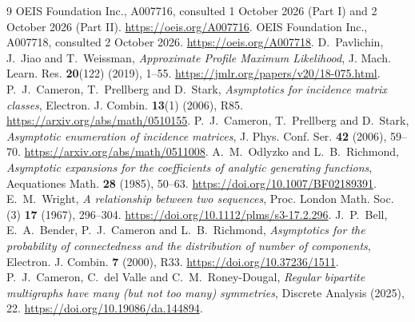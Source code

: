 \documentclass[11pt,a4paper]{article}
\theoremstyle{remark}\newtheorem{remark}[theorem]{Remark}%
\begin{document}
\begin{thebibliography}{9}\small
{} OEIS Foundation Inc., A007716, consulted 1 October 2026 (Part I) and 2 October 2026 (Part II). \url{https://oeis.org/A007716}.
 OEIS Foundation Inc., A007718, consulted 2 October 2026. \url{https://oeis.org/A007718}.
 D.~Pavlichin, J.~Jiao and T.~Weissman, \emph{Approximate Profile Maximum Likelihood}, J. Mach. Learn. Res. \textbf{20}(122) (2019), 1--55. \url{https://jmlr.org/papers/v20/18-075.html}.
 P.~J.~Cameron, T.~Prellberg and D.~Stark, \emph{Asymptotics for incidence matrix classes}, Electron. J. Combin. \textbf{13}(1) (2006), R85. \url{https://arxiv.org/abs/math/0510155}.
 P.~J.~Cameron, T.~Prellberg and D.~Stark, \emph{Asymptotic enumeration of incidence matrices}, J. Phys. Conf. Ser. \textbf{42} (2006), 59--70. \url{https://arxiv.org/abs/math/0511008}.
 A.~M.~Odlyzko and L.~B.~Richmond, \emph{Asymptotic expansions for the coefficients of analytic generating functions}, Aequationes Math. \textbf{28} (1985), 50--63. \url{https://doi.org/10.1007/BF02189391}.
 E.~M.~Wright, \emph{A relationship between two sequences}, Proc. London Math. Soc. (3) \textbf{17} (1967), 296--304. \url{https://doi.org/10.1112/plms/s3-17.2.296}.
 J.~P.~Bell, E.~A.~Bender, P.~J.~Cameron and L.~B.~Richmond, \emph{Asymptotics for the probability of connectedness and the distribution of number of components}, Electron. J. Combin. \textbf{7} (2000), R33. \url{https://doi.org/10.37236/1511}.
 P.~J.~Cameron, C.~del Valle and C.~M.~Roney-Dougal, \emph{Regular bipartite multigraphs have many (but not too many) symmetries}, Discrete Analysis (2025), 22. \url{https://doi.org/10.19086/da.144894}.
\end{thebibliography}
\end{document}

